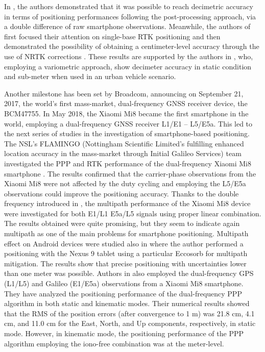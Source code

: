 In \cite{realini2017}, the authors demonstrated that it was possible to reach  decimetric  accuracy in terms of positioning performances following the post-processing approach, via a double difference of raw smartphone observations. Meanwhile, the authors of \cite{Dabove2019b} first focused their attention on single-base RTK positioning and then demonstrated the possibility
of obtaining a centimeter-level accuracy through the use of NRTK corrections \cite{Dabove2019b}.
These results are supported by the authors in \cite{pirazzi2017}, who, employing a variometric approach, show decimeter accuracy in static condition and sub-meter when used in an urban vehicle scenario.

Another milestone has been set by Broadcom, announcing on September 21, 2017, the world’s first mass-market, dual-frequency GNSS receiver device, the BCM47755. In May 2018, the Xiaomi Mi8 became the first smartphone in the world, employing a dual-frequency
GNSS receiver L1/E1 – L5/E5a. This led to the next series of studies in the investigation of smartphone-based positioning. 
The NSL’s FLAMINGO (Nottingham Scientific Limited’s fulfilling enhanced location accuracy in the mass-market through Initial Galileo Services) team investigated the PPP and RTK performance of the dual-frequency Xiaomi Mi8 smartphone \cite{Fortunato2019,Roberts2018}. The results confirmed that the carrier-phase observations from the Xiaomi Mi8 were not affected by the duty cycling and employing the L5/E5a observations could improve the positioning accuracy.
Thanks to the double frequency introduced in \cite{Robustelli:2019}, the multipath performance of the Xiaomi Mi8 device were investigated for both E1/L1 E5a/L5 signals using proper linear combination. The results obtained were quite promising, but they seem to indicate again multipath as  one of the main problems for smartphone positioning. Multipath effect on Android devices were studied also in \cite{hakansson:2019} where the author performed a positioning with the Nexus 9 tablet using a particular Eccosorb for multipath mitigation. The results show that precise positioning with uncertainties lower than one meter was possible.
Authors in \cite{Wu2019} also employed the dual-frequency GPS (L1/L5) and Galileo (E1/E5a) observations from a Xiaomi Mi8 smartphone. They have analyzed the positioning performance of the dual-frequency PPP algorithm in both static and kinematic modes. Their numerical results showed that the RMS of the position errors (after convergence to 1 m) was 21.8 cm, 4.1 cm, and 11.0 cm for the East, North, and Up components, respectively, in static mode. However, in kinematic mode, the positioning performance of the PPP algorithm employing the iono-free combination was at the meter-level.
